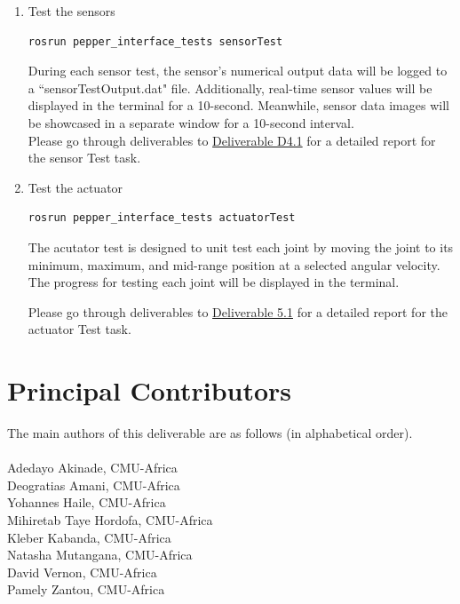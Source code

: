 \documentclass{CSSRforAfrica}
\newcommand{\blank}{~\\}
\begin{document}
{\begin{enumerate}
\item Test the sensors
\begin{lstlisting}[style=withoutNumbering, language=bash]
rosrun pepper_interface_tests sensorTest
\end{lstlisting}
During each sensor test, the sensor's numerical output data will be logged to a ``sensorTestOutput.dat" file. Additionally, real-time sensor values will be displayed in the terminal for a 10-second. Meanwhile, sensor data images will be showcased in a separate window for a 10-second interval.\\

Please go through deliverables to \href{https://cssr4africa.github.io/deliverables/CSSR4Africa_Deliverable_D4.1.pdf}
{Deliverable D4.1} for a detailed report for the sensor Test task.

\item Test the actuator
\begin{lstlisting}[style=withoutNumbering, language=bash]
rosrun pepper_interface_tests actuatorTest
\end{lstlisting}

The acutator test is designed to unit test each joint by moving the joint to its minimum, maximum, and mid-range position at a selected angular velocity. The progress for testing each joint will be displayed in the terminal. 

Please go through deliverables to \href{https://cssr4africa.github.io/deliverables/CSSR4Africa_Deliverable_D5.1.pdf}
{Deliverable 5.1} for a detailed report for the actuator Test task.

\end{enumerate}

\newpage


\newpage

\section*{Principal Contributors}
\label{contributors}
The main authors of this deliverable are as follows (in alphabetical order).
\blank
~
\blank
Adedayo Akinade, CMU-Africa\\          %
Deogratias Amani, CMU-Africa\\  
Yohannes Haile, CMU-Africa\\ 
Mihiretab Taye Hordofa, CMU-Africa\\ 
Kleber Kabanda, CMU-Africa\\
Natasha Mutangana, CMU-Africa\\ 
David Vernon, CMU-Africa\\
Pamely Zantou, CMU-Africa\\ 

}
\end{document}
